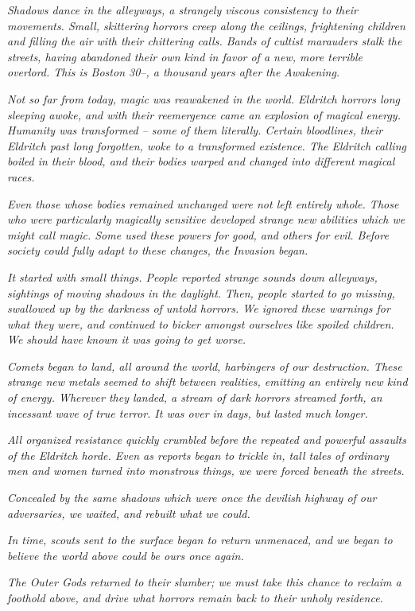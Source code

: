 \documentclass[./main.tex]{subfiles}
\begin{document}
\textit{Shadows dance in the alleyways, a strangely viscous consistency to their movements. Small, skittering horrors creep along the ceilings, frightening children and filling the air with their chittering calls. Bands of cultist marauders stalk the streets, having abandoned their own kind in favor of a new, more terrible overlord. This is Boston 30--, a thousand years after the Awakening.}

\textit{Not so far from today, magic was reawakened in the world. Eldritch horrors long sleeping awoke, and with their reemergence came an explosion of magical energy. Humanity was transformed -- some of them literally. Certain bloodlines, their Eldritch past long forgotten, woke to a transformed existence. The Eldritch calling boiled in their blood, and their bodies warped and changed into different magical races.}

\textit{Even those whose bodies remained unchanged were not left entirely whole. Those who were particularly magically sensitive developed strange new abilities which we might call magic. Some used these powers for good, and others for evil. Before society could fully adapt to these changes, the Invasion began.}

\textit{It started with small things. People reported strange sounds down alleyways, sightings of moving shadows in the daylight. Then, people started to go missing, swallowed up by the darkness of untold horrors. We ignored these warnings for what they were, and continued to bicker amongst ourselves like spoiled children. We should have known it was going to get worse.}

\textit{Comets began to land, all around the world, harbingers of our destruction. These strange new metals seemed to shift between realities, emitting an entirely new kind of energy. Wherever they landed, a stream of dark horrors streamed forth, an incessant wave of true terror. It was over in days, but lasted much longer.}

\textit{All organized resistance quickly crumbled before the repeated and powerful assaults of the Eldritch horde. Even as reports began to trickle in, tall tales of ordinary men and women turned into monstrous things, we were forced beneath the streets.} 

\textit{Concealed by the same shadows which were once the devilish highway of our adversaries, we waited, and rebuilt what we could.}

\textit{In time, scouts sent to the surface began to return unmenaced, and we began to believe the world above could be ours once again.}

\textit{The Outer Gods returned to their slumber; we must take this chance to reclaim a foothold above, and drive what horrors remain back to their unholy residence.}
\end{document}

